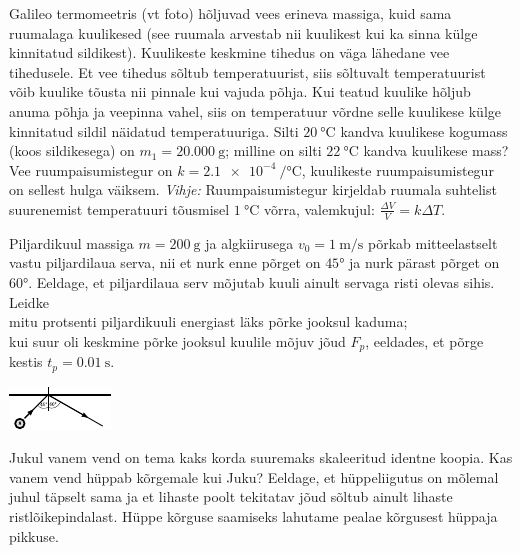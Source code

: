 \documentclass[10pt]{article}
\begin{document}
Galileo termomeetris (vt foto) hõljuvad vees erineva massiga, kuid sama ruumalaga kuulikesed (see ruumala arvestab nii kuulikest kui ka sinna külge kinnitatud sildikest). Kuulikeste keskmine tihedus on väga lähedane vee tihedusele. Et vee tihedus sõltub temperatuurist, siis sõltuvalt temperatuurist võib kuulike tõusta nii pinnale kui vajuda põhja. Kui teatud kuulike hõljub anuma põhja ja veepinna vahel, siis on temperatuur võrdne selle kuulikese külge kinnitatud sildil näidatud temperatuuriga. Silti $\SI{20}\celsius$ kandva kuulikese kogumass (koos sildikesega) on $m_1=\SI{20.000}{\g}$; milline on silti $\SI{22}\celsius$ kandva kuulikese mass? Vee ruumpaisumistegur on $k=\SI{2.1e-4}{\per\celsius}$, kuulikeste ruumpaisumistegur on sellest hulga väiksem. \textit{Vihje:} Ruumpaisumistegur kirjeldab ruumala suhtelist suurenemist temperatuuri tõusmisel $\SI{1}{\celsius}$ võrra, valemkujul: $\frac{\Delta V}{V} = k\Delta T$.
\probend
\bigskip


Piljardikuul massiga $m=\SI{200}{\g}$ ja algkiirusega $v_0=\SI{1}{\m\per\s}$ põrkab mitteelastselt vastu piljardilaua serva, nii et nurk enne põrget on $\ang{45}$ ja nurk pärast põrget on $\ang{60}$. Eeldage, et piljardilaua serv mõjutab kuuli ainult servaga risti olevas sihis. Leidke\\
\osa mitu protsenti piljardikuuli energiast läks põrke jooksul kaduma;\\
\osa kui suur oli keskmine põrke jooksul kuulile mõjuv jõud $F_p$, eeldades, et põrge kestis $t_p=\SI{0.01}{\s}$.
\begin{center}
  \vspace{-1em}
  \includegraphics[width=0.6\linewidth]{2024-v3g-04-yl.pdf}
  \vspace{-1em}
\end{center}
\probend
\bigskip


Jukul vanem vend on tema kaks korda suuremaks skaleeritud identne koopia. Kas vanem vend hüppab kõrgemale kui Juku? Eeldage, et hüppeliigutus on mõlemal juhul täpselt sama ja et lihaste poolt tekitatav jõud sõltub ainult lihaste ristlõikepindalast. Hüppe kõrguse saamiseks lahutame pealae kõrgusest hüppaja pikkuse.
\probend
\bigskip
\end{document}
